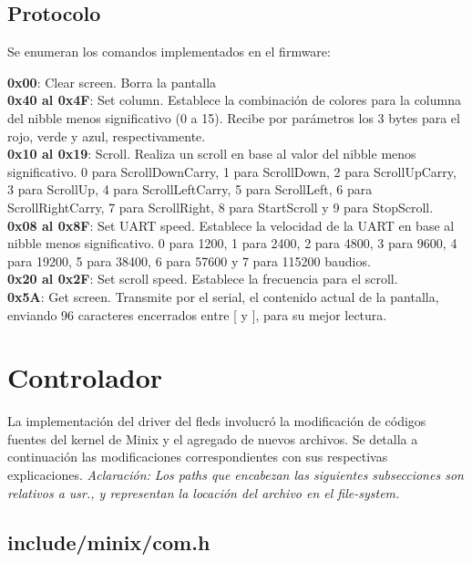 \documentclass[a4paper,11pt,epsf]{article}
\begin{document}
\subsection{Protocolo}
Se enumeran los comandos implementados en el firmware:


\textbf{0x00}: Clear screen. Borra la pantalla \\


\textbf{0x40 al 0x4F}: Set column. Establece la combinaci\'on de colores para la columna del nibble menos significativo (0 a 15). Recibe por par\'ametros los 3 bytes para el rojo, verde y azul, respectivamente. \\


\textbf{0x10 al 0x19}: Scroll. Realiza un scroll en base al valor del nibble menos significativo. 0 para ScrollDownCarry, 1 para ScrollDown, 2 para ScrollUpCarry, 3 para ScrollUp, 4 para ScrollLeftCarry, 5 para ScrollLeft, 6 para ScrollRightCarry, 7 para ScrollRight, 8 para  StartScroll y 9 para StopScroll. \\


\textbf{0x08 al 0x8F}: Set UART speed. Establece la velocidad de la UART en base al nibble menos significativo.  0 para 1200, 1 para  2400, 2 para 4800, 3 para 9600, 4 para 19200, 5 para 38400, 6 para 57600 y 7 para 115200 baudios. \\


\textbf{0x20 al 0x2F}: Set scroll speed. Establece la frecuencia para el scroll.\\


\textbf{0x5A}: Get screen. Transmite por el serial, el contenido actual de la  pantalla, enviando 96 caracteres encerrados entre [ y ], para su mejor lectura. \\

\section{Controlador}
La implementaci\'on del driver del fleds involucr\'o la modificaci\'on de c\'odigos fuentes del kernel de Minix y el agregado de nuevos archivos. Se detalla a continuaci\'on las modificaciones correspondientes con sus respectivas explicaciones. 
\textit{Aclaraci\'on: Los paths que encabezan las siguientes subsecciones son relativos a \emph{\/usr\/}., y representan la locaci\'on del archivo en el file-system.}

\subsection{include/minix/com.h}
\end{document}
